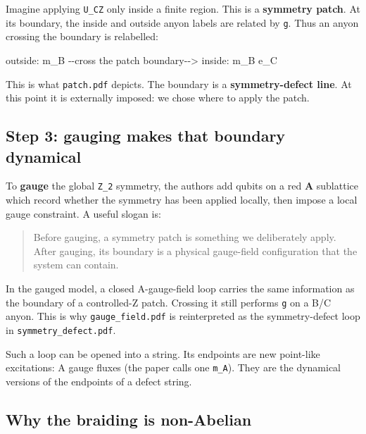 \documentclass[
]{article}
\newenvironment{Shaded}{}{}
\newcommand{\NormalTok}[1]{#1}
\begin{document}
Imagine applying \texttt{U\_CZ} only inside a finite region. This is a
\textbf{symmetry patch}. At its boundary, the inside and outside anyon
labels are related by \texttt{g}. Thus an anyon crossing the boundary is
relabelled:

\begin{Shaded}
\begin{Highlighting}[]
\NormalTok{outside: m\_B       {-}{-}cross the patch boundary{-}{-}\textgreater{}       inside: m\_B e\_C}
\end{Highlighting}
\end{Shaded}

This is what \texttt{patch.pdf} depicts. The boundary is a
\textbf{symmetry-defect line}. At this point it is externally imposed:
we chose where to apply the patch.

\subsection{Step 3: gauging makes that boundary
dynamical}\label{step-3-gauging-makes-that-boundary-dynamical}

To \textbf{gauge} the global \texttt{Z\_2} symmetry, the authors add
qubits on a red \textbf{A} sublattice which record whether the symmetry
has been applied locally, then impose a local gauge constraint. A useful
slogan is:

\begin{quote}
Before gauging, a symmetry patch is something we deliberately apply.
After gauging, its boundary is a physical gauge-field configuration that
the system can contain.
\end{quote}

In the gauged model, a closed A-gauge-field loop carries the same
information as the boundary of a controlled-Z patch. Crossing it still
performs \texttt{g} on a B/C anyon. This is why
\texttt{gauge\_field.pdf} is reinterpreted as the symmetry-defect loop
in \texttt{symmetry\_defect.pdf}.

Such a loop can be opened into a string. Its endpoints are new
point-like excitations: A gauge fluxes (the paper calls one
\texttt{m\_A}). They are the dynamical versions of the endpoints of a
defect string.

\subsection{Why the braiding is
non-Abelian}\label{why-the-braiding-is-non-abelian}
\end{document}
